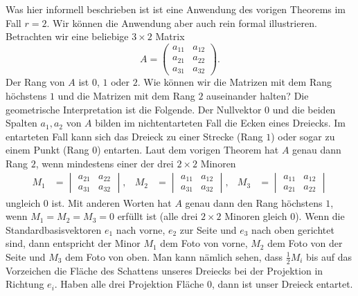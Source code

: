 \begin{bsp}
	Was hier informell beschrieben ist ist eine Anwendung des vorigen Theorems im Fall $r=2$. Wir können die Anwendung aber auch rein formal illustrieren. Betrachten wir eine beliebige $3 \times 2$ Matrix
	\[
		A = \begin{pmatrix} a_{11} & a_{12} \\ a_{21} & a_{22} \\ a_{31} & a_{32} \end{pmatrix}.
	\]
	Der Rang von $A$ ist $0$, $1$ oder $2$. Wie können wir die Matrizen mit dem Rang höchstens $1$ und die Matrizen mit dem Rang $2$ auseinander halten? Die geometrische Interpretation ist die Folgende. Der Nullvektor $0$ und die beiden Spalten $a_1, a_2$ von $A$ bilden im nichtentarteten Fall die Ecken eines Dreiecks. Im entarteten Fall kann sich das Dreieck zu einer Strecke (Rang $1$) oder sogar zu einem Punkt (Rang $0$) entarten. Laut dem vorigen Theorem hat $A$ genau dann Rang $2$, wenn mindestens einer der drei $2 \times 2$ Minoren
	\begin{align*}
			M_1 & = \begin{vmatrix} a_{21} & a_{22} \\ a_{31} & a_{32} \end{vmatrix}, &
			M_2 & = \begin{vmatrix} a_{11} & a_{12} \\ a_{31} & a_{32} \end{vmatrix}, &
			 M_3 & = \begin{vmatrix} a_{11} & a_{12} \\ a_{21} & a_{22} \end{vmatrix}  
	\end{align*}
	ungleich $0$ ist. Mit anderen Worten hat $A$ genau dann den Rang höchstens $1$, wenn $M_1 = M_2 = M_3=0$ erfüllt ist (alle drei $2 \times 2$ Minoren gleich $0$). Wenn die Standardbasisvektoren $e_1$ nach vorne, $e_2$ zur Seite und $e_3$ nach oben gerichtet sind, dann entspricht der Minor $M_1$ dem Foto von vorne, $M_2$ dem Foto von der Seite und $M_3$ dem Foto von oben. Man kann nämlich sehen, dass $\frac{1}{2} M_i$ bis auf das Vorzeichen die Fläche des Schattens unseres Dreiecks bei der Projektion in Richtung $e_i$. Haben alle drei Projektion Fläche $0$, dann ist unser Dreieck entartet. 
\end{bsp}


